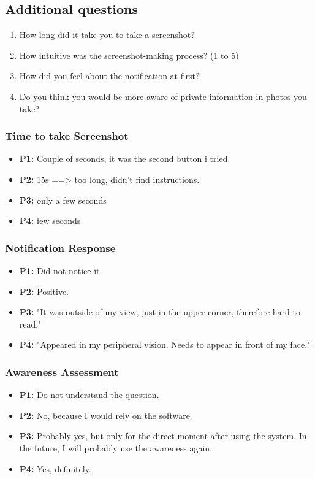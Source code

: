 \documentclass[sigconf,authordraft]{acmart}
\begin{document}
\subsection{Additional questions}
\label{appendix:additional-questions}
\begin{enumerate}
    \item How long did it take you to take a screenshot?
    \item How intuitive was the screenshot-making process? (1 to 5)
    \item How did you feel about the notification at first?
    \item Do you think you would be more aware of private information in photos you take?
\end{enumerate}


\subsubsection{Time to take Screenshot}
\begin{itemize}
    \item \textbf{P1:} Couple of seconds, it was the second button i tried.
    \item \textbf{P2:} 15s ==> too long, didn't find instructions.
    \item \textbf{P3:} only a few seconds
    \item \textbf{P4:} few seconds
\end{itemize}


\subsubsection{Notification Response}
\begin{itemize}
    \item \textbf{P1:} Did not notice it.
    \item \textbf{P2:} Positive.
    \item \textbf{P3:} "It was outside of my view, just in the upper corner, therefore hard to read."
    \item \textbf{P4:} "Appeared in my peripheral vision. Needs to appear in front of my face."
\end{itemize}

\subsubsection{Awareness Assessment}
\begin{itemize}
    \item \textbf{P1:} Do not understand the question.
    \item \textbf{P2:} No, because I would rely on the software.
    \item \textbf{P3:} Probably yes, but only for the direct moment after using the system. In the future, I will probably use the awareness again.
    \item \textbf{P4:} Yes, definitely.
\end{itemize}
\end{document}
